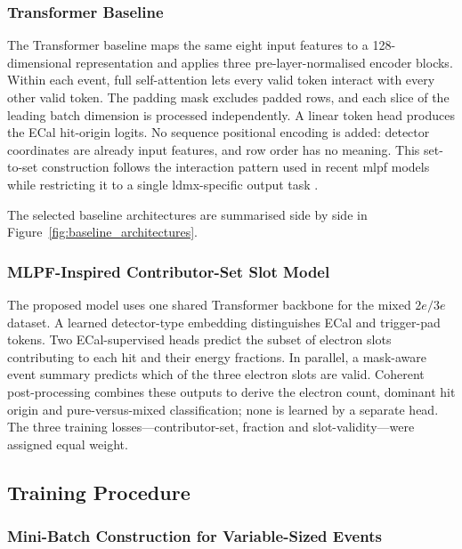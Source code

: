 \subsubsection{Transformer Baseline}

The Transformer baseline maps the same eight input features to a
128-dimensional representation and applies three pre-layer-normalised
encoder blocks. Within each event, full self-attention lets every valid token
interact with every other valid token. The padding mask excludes padded rows,
and each slice of the leading batch dimension is processed independently. A
linear token head produces the ECal hit-origin logits. No sequence positional
encoding is added: detector coordinates are already input features, and row
order has no meaning. This set-to-set construction follows the interaction
pattern used in recent \gls{mlpf} models while restricting it to a single
\gls{ldmx}-specific output task
\cite{pata2026-mlpf}.

The selected baseline architectures are summarised side by side in
Figure~\ref{fig:baseline_architectures}.



\subsubsection{MLPF-Inspired Contributor-Set Slot Model}

The proposed model uses one shared Transformer backbone for the mixed
\(2e/3e\) dataset. A learned detector-type embedding distinguishes ECal and
trigger-pad tokens. Two ECal-supervised heads predict the subset of electron
slots contributing to each hit and their energy fractions. In parallel, a
mask-aware event summary predicts which of the three electron slots are
valid. Coherent post-processing combines these outputs to derive the electron
count, dominant hit origin and pure-versus-mixed classification; none is
learned by a separate head. The three training losses---contributor-set,
fraction and slot-validity---were assigned equal weight.



\subsection{Training Procedure}

\subsubsection{Mini-Batch Construction for Variable-Sized Events}
\label{sec:method_batching}

